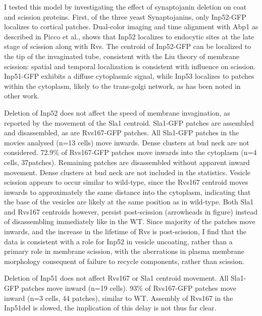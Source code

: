 	\vspace{5mm}
	I tested this model by investigating the effect of synaptojanin deletion on coat and scission proteins. First, of the three yeast Synaptojanins, only Inp52-GFP localizes to cortical patches. Dual-color imaging and time alignment with Abp1 as described in Picco et al., shows that Inp52 localizes to endocytic sites at the late stage of scission along with Rvs. The centroid of Inp52-GFP can be localized to the tip of the invaginated tube, consistent with the Liu theory of membrane scission: spatial and temporal localization is consistent with influence on scission. Inp51-GFP exhibits a diffuse cytoplasmic signal, while Inp53 localizes to patches within the cytoplasm, likely to the trans-golgi network, as has been noted in other work. 



	\vspace{5mm}
	Deletion of Inp52 does not affect the speed of membrane invagination, as reported by the movement of the Sla1 centroid. Sla1-GFP patches are assembled and disassembled, as are Rvs167-GFP patches. All Sla1-GFP patches in the movies analysed (n=13 cells) move inwards.  Dense clusters at bud neck are not considered. 72.9\% of Rvs167-GFP patches move inwards into the cytoplasm (n=4 cells, 37patches). Remaining patches are disassembled without apparent inward movement. Dense clusters at bud neck are not included in the statistics. Vesicle scission appears to occur similar to wild-type, since the Rvs167 centroid moves inwards to approximately the same distance into the cytoplasm, indicating that the base of the vesicles are likely at the same position as in wild-type. Both Sla1 and Rvs167 centroids however, persist post-scission (arrowheads in figure) instead of disassembling immediately like in the WT. Since majority of the patches move inwards, and the increase in the lifetime of Rvs is post-scission, I find that the data is consistent with a role for Inp52 in vesicle uncoating, rather than a primary role in membrane scission, with the aberrations in plasma membrane morphology consequent of failure to recycle components, rather than scission. 
	


	\vspace{5mm}
	Deletion of Inp51 does not affect Rvs167 or Sla1 centroid movement. All Sla1-GFP patches move inward (n=19 cells). 93\% of Rvs167-GFP patches move inward (n=3 cells, 44 patches), similar to WT. Assembly of Rvs167 in the Inp51del is slowed, the implication of this delay is not thus far clear. 


